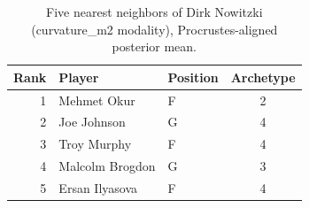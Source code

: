 \begin{table}[htbp]
  \centering\small
  \begin{tabular}{rllc}
    \toprule
    Rank & Player & Position & Archetype \\
    \midrule
    1 & Mehmet Okur & F & 2 \\
    2 & Joe Johnson & G & 4 \\
    3 & Troy Murphy & F & 4 \\
    4 & Malcolm Brogdon & G & 3 \\
    5 & Ersan Ilyasova & F & 4 \\
    \bottomrule
  \end{tabular}
  \caption{Five nearest neighbors of Dirk Nowitzki (curvature_m2 modality), Procrustes-aligned posterior mean.}
  \label{tab:Dirk_Nowitzki_neighbors_curvature_m2}
\end{table}

